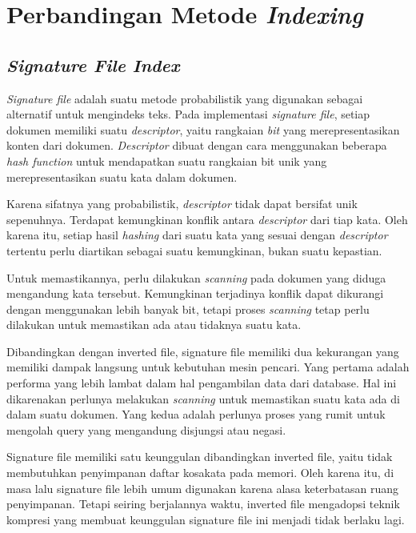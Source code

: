 \section{Perbandingan Metode \emph{Indexing}}

\subsection{\emph{Signature File Index}}

\emph{Signature file} adalah suatu metode probabilistik yang digunakan sebagai
alternatif untuk mengindeks teks. Pada implementasi \emph{signature file},
setiap dokumen memiliki suatu \emph{descriptor}, yaitu rangkaian \emph{bit} yang
merepresentasikan konten dari dokumen. \emph{Descriptor} dibuat dengan cara
menggunakan beberapa \emph{hash function} untuk mendapatkan suatu rangkaian bit
unik yang merepresentasikan suatu kata dalam dokumen. 

Karena sifatnya yang probabilistik, \emph{descriptor} tidak dapat bersifat unik
sepenuhnya. Terdapat kemungkinan konflik antara \emph{descriptor} dari tiap
kata. Oleh karena itu, setiap hasil \emph{hashing} dari suatu kata yang sesuai
dengan \emph{descriptor} tertentu perlu diartikan sebagai suatu kemungkinan,
bukan suatu kepastian.

Untuk memastikannya, perlu dilakukan \emph{scanning} pada dokumen yang diduga
mengandung kata tersebut. Kemungkinan terjadinya konflik dapat dikurangi dengan
menggunakan lebih banyak bit, tetapi proses \emph{scanning} tetap perlu
dilakukan untuk memastikan ada atau tidaknya suatu kata.

Dibandingkan dengan inverted file, signature file memiliki dua kekurangan yang
memiliki dampak langsung untuk kebutuhan mesin pencari. Yang pertama adalah
performa yang lebih lambat dalam hal pengambilan data dari database. Hal ini
dikarenakan perlunya melakukan \emph{scanning} untuk memastikan suatu kata ada
di dalam suatu dokumen. Yang kedua adalah perlunya proses yang rumit untuk
mengolah query yang mengandung disjungsi atau negasi.

Signature file memiliki satu keunggulan dibandingkan inverted file, yaitu tidak
membutuhkan penyimpanan daftar kosakata pada memori. Oleh karena itu, di masa
lalu signature file lebih umum digunakan karena alasa keterbatasan ruang
penyimpanan. Tetapi seiring berjalannya waktu, inverted file mengadopsi teknik
kompresi yang membuat keunggulan signature file ini menjadi tidak berlaku lagi.


